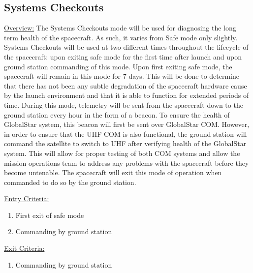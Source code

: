 \documentclass{article}
\begin{document}
\clearpage

\subsection{Systems Checkouts}

\underline{Overview:} The Systems Checkouts mode will be used for diagnosing the long term health of the spacecraft. As such, it varies from Safe mode only slightly. Systems Checkouts will be used at two different times throughout the lifecycle of the spacecraft: upon exiting safe mode for the first time after launch and upon ground station commanding of this mode. Upon first exiting safe mode, the spacecraft will remain in this mode for 7 days. This will be done to determine that there has not been any subtle degradation of the spacecraft hardware cause by the launch environment and that it is able to function for extended periods of time. During this mode, telemetry will be sent from the spacecraft down to the ground station every hour in the form of a beacon. To ensure the health of GlobalStar system, this beacon will first be sent over GlobalStar COM. However, in order to ensure that the UHF COM is also functional, the ground station will command the satellite to switch to UHF after verifying health of the GlobalStar system. This will allow for proper testing of both COM systems and allow the mission operations team to address any problems with the spacecraft before they become untenable. The spacecraft will exit this mode of operation when commanded to do so by the ground station.

\underline{Entry Criteria:} 

\begin{enumerate}
\item First exit of safe mode
\item Commanding by ground station
\end{enumerate}

\underline{Exit Criteria:}

\begin{enumerate}
\item Commanding by ground station
\end{enumerate}
\end{document}
